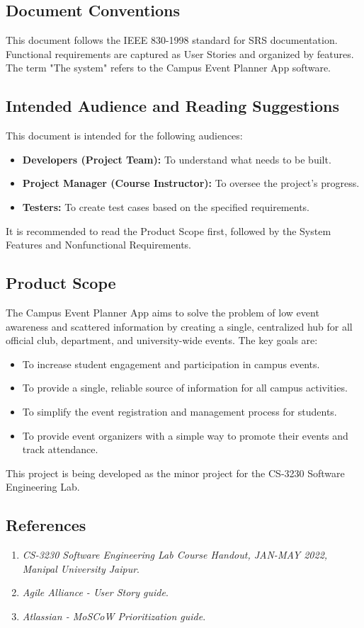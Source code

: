 \documentclass[11pt, a4paper]{article}
\begin{document}
\subsection{Document Conventions}
This document follows the IEEE 830-1998 standard for SRS documentation. Functional requirements are captured as User Stories and organized by features. The term "The system" refers to the Campus Event Planner App software.

\subsection{Intended Audience and Reading Suggestions}
This document is intended for the following audiences:
\begin{itemize}
    \item \textbf{Developers (Project Team):} To understand what needs to be built.
    \item \textbf{Project Manager (Course Instructor):} To oversee the project's progress.
    \item \textbf{Testers:} To create test cases based on the specified requirements.
\end{itemize}
It is recommended to read the Product Scope first, followed by the System Features and Nonfunctional Requirements.

\subsection{Product Scope}
The Campus Event Planner App aims to solve the problem of low event awareness and scattered information by creating a single, centralized hub for all official club, department, and university-wide events. The key goals are:
\begin{itemize}
    \item To increase student engagement and participation in campus events.
    \item To provide a single, reliable source of information for all campus activities.
    \item To simplify the event registration and management process for students.
    \item To provide event organizers with a simple way to promote their events and track attendance.
\end{itemize}
This project is being developed as the minor project for the CS-3230 Software Engineering Lab.

\subsection{References}
\begin{enumerate}
    \item \textit{CS-3230 Software Engineering Lab Course Handout, JAN-MAY 2022, Manipal University Jaipur}.
    \item \textit{Agile Alliance - User Story guide}.
    \item \textit{Atlassian - MoSCoW Prioritization guide}.
\end{enumerate}
\end{document}
